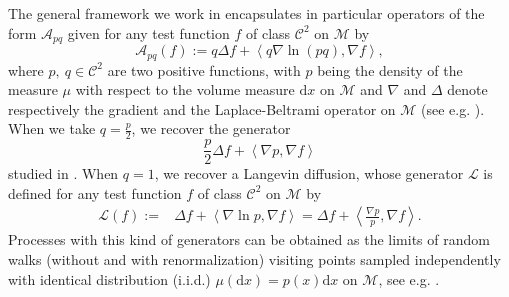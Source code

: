 \documentclass[10pt,a4paper]{article}
\newcommand{\cL}{\mathcal{L}}
\newcommand\cA{\mathcal{A}}
\newcommand\cC{\mathcal{C}}
\newcommand\cM{\mathcal{M}}
\newcommand\dd{\mathrm{d}}
\newcommand{\SCA}[1]{{{\left\langle #1\right\rangle}}} %
\begin{document}
The general framework we work in encapsulates in particular operators of the form  $\mathcal{A}_{pq}$ given for any test function $f$ of class $\cC^2$ on $\cM$ by
\begin{equation}\label{eq:A}
\cA_{pq}(f):=q\Delta f+\SCA{q\nabla \ln (p q),\nabla f},
\end{equation}
where $p ,\ q\in \cC^2$ are two positive functions, with $p$ being the density of the measure $\mu$ with respect to the volume measure $\dd x$ on $\cM$ %
and  $\nabla$ and $\Delta$ denote respectively the gradient and the Laplace-Beltrami operator on $\cM$ (see e.g. \cite{Wang2014}). 
When we take $q=\frac{p}{2}$, we recover the generator 
\[\frac{p}{2}\Delta f+\SCA{\nabla p,\nabla f}\]
studied in \cite{Calder2022,Gine2006,guerinnguyentran}. When $q= 1$, we recover a Langevin diffusion, whose generator $\cL$ is  defined for any test function $f$ of class $\cC^2$ on $\cM$ by
\begin{align}\label{eq:L}
 \cL(f):= & \Delta f+\SCA{\nabla \ln p, \nabla f}
 =  \Delta f +\SCA{\frac{\nabla p}{p}, \nabla f}.
 \end{align}
Processes with this kind of generators can be obtained as the limits of random walks (without and with renormalization) visiting points sampled independently with identical distribution (i.i.d.) $\mu(\dd x)=p(x)\dd x$ on $\cM$, see e.g. \cite{Calder2022,Gine2006,guerinnguyentran}.
\end{document}
